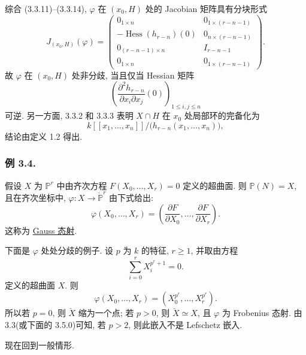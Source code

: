 综合 (3.3.11)--(3.3.14), $\varphi$ 在 $(x_0,H)$ 处的 Jacobian 矩阵具有分块形式
\begin{equation}\tag{3.3.15}
J_{(x_0,H)}(\varphi)=
\left(
\begin{array}{c|c}
0_{1\times n} & 0_{1\times(r-n-1)}\\ \hline
-\operatorname{Hess}(h_{r-n})(0) & 0_{n\times(r-n-1)}\\ \hline
0_{(r-n-1)\times n} & I_{r-n-1}\\ \hline
0_{1\times n} & 0_{1\times(r-n-1)}
\end{array}
\right).
\end{equation}
故 $\varphi$ 在 $(x_0,H)$ 处非分歧, 当且仅当 Hessian 矩阵
\[
\left(
\frac{\partial^2h_{r-n}}{\partial x_i\partial x_j}(0)
\right)_{1\leq i,j\leq n}
\]
可逆. 另一方面, 3.3.2 和 3.3.3 表明 $X\cap H$ 在 $x_0$ 处局部环的完备化为
\begin{equation}\tag{3.3.16}
k[[x_1,\ldots,x_n]]/
\bigl(h_{r-n}(x_1,\ldots,x_n)\bigr),
\end{equation}
结论由定义 1.2 得出.

\subsubsection*{例 3.4.}
假设 $X$ 为 $\mathbb P^r$ 中由齐次方程 $F(X_0,\ldots,X_r)=0$ 定义的超曲面. 则 $\mathbb P(N)=X$, 且在齐次坐标中, $\varphi:X\to\check{\mathbb P}^{r}$ 由下式给出:
\begin{equation}\tag{3.4.1}
\varphi(X_0,\ldots,X_r)=
\left(
\frac{\partial F}{\partial X_0},\ldots,
\frac{\partial F}{\partial X_r}
\right).
\end{equation}
这称为 \underline{Gauss 态射}.

下面是 $\varphi$ 处处分歧的例子. 设 $p$ 为 $k$ 的特征, $r\geq1$, 并取由方程
\begin{equation}\tag{3.4.2}
\sum_{i=0}^{r}X_i^{p^r+1}=0.
\end{equation}
定义的超曲面 $X$. 则
\begin{equation}\tag{3.4.3}
\varphi(X_0,\ldots,X_r)
=(X_0^{p^r},\ldots,X_r^{p^r}).
\end{equation}
所以若 $p=0$, 则 $\check X$ 缩为一个点; 若 $p>0$, 则 $\check X\simeq X$, 且 $\varphi$ 为 Frobenius 态射. 由 3.3(或下面的 3.5.0)可知, 若 $p>2$, 则此嵌入不是 Lefschetz 嵌入.

现在回到一般情形.